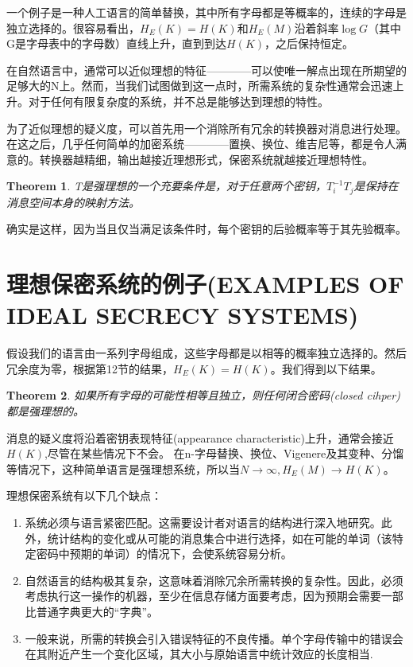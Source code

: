 \documentclass[]{article}
\newtheorem{theorem}{Theorem}
\begin{document}
一个例子是一种人工语言的简单替换，其中所有字母都是等概率的，连续的字母是独立选择的。很容易看出，$H_E(K)=H(K)$和$H_E(M)$沿着斜率$\log{G}$（其中G是字母表中的字母数）直线上升，直到到达$H(K)$，之后保持恒定。

在自然语言中，通常可以近似理想的特征————可以使唯一解点出现在所期望的足够大的N上。然而，当我们试图做到这一点时，所需系统的复杂性通常会迅速上升。对于任何有限复杂度的系统，并不总是能够达到理想的特性。

为了近似理想的疑义度，可以首先用一个消除所有冗余的转换器对消息进行处理。在这之后，几乎任何简单的加密系统————置换、换位、维吉尼等，都是令人满意的。转换器越精细，输出越接近理想形式，保密系统就越接近理想特性。

\begin{theorem}
	T是强理想的一个充要条件是，对于任意两个密钥，$T_i^{-1}T_j$是保持在消息空间本身的映射方法。
\end{theorem}

确实是这样，因为当且仅当满足该条件时，每个密钥的后验概率等于其先验概率。

\newpage
%   
%

\section{理想保密系统的例子(EXAMPLES OF IDEAL SECRECY SYSTEMS)}

假设我们的语言由一系列字母组成，这些字母都是以相等的概率独立选择的。然后冗余度为零，根据第12节的结果，$H_E(K)=H(K)$。我们得到以下结果。

\begin{theorem}
	如果所有字母的可能性相等且独立，则任何闭合密码(closed cihper)都是强理想的。
\end{theorem}

消息的疑义度将沿着密钥表现特征(appearance characteristic)上升，通常会接近$H(K)$,尽管在某些情况下不会。
在n-字母替换、换位、Vigenere及其变种、分馏等情况下，这种简单语言是强理想系统，所以当$N\rightarrow \infty,H_E(M)\rightarrow H(K)$。

理想保密系统有以下几个缺点：
\begin{enumerate}
	\item 系统必须与语言紧密匹配。这需要设计者对语言的结构进行深入地研究。此外，统计结构的变化或从可能的消息集合中进行选择，如在可能的单词（该特定密码中预期的单词）的情况下，会使系统容易分析。
	\item 自然语言的结构极其复杂，这意味着消除冗余所需转换的复杂性。因此，必须考虑执行这一操作的机器，至少在信息存储方面要考虑，因为预期会需要一部比普通字典更大的“字典”。
	\item 一般来说，所需的转换会引入错误特征的不良传播。单个字母传输中的错误会在其附近产生一个变化区域，其大小与原始语言中统计效应的长度相当.
\end{enumerate}
\end{document}
